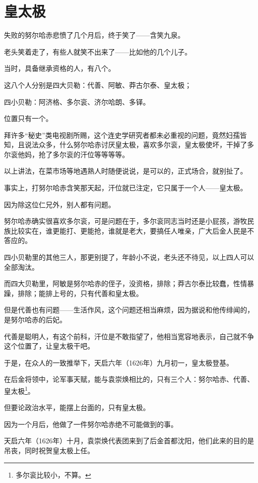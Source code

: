 \section{皇太极}
\ifnum{}
	\begin{multicols}{\theparacolNo}
\fi
失败的努尔哈赤悲愤了几个月后，终于笑了——含笑九泉。

老头笑着走了，有些人就笑不出来了——比如他的几个儿子。

当时，具备继承资格的人，有八个。

这八个人分别是四大贝勒：代善、阿敏、莽古尔泰、皇太极；

四小贝勒：阿济格、多尔衮、济尔哈朗、多铎。

位置只有一个。

拜许多“秘史”类电视剧所赐，这个连史学研究者都未必重视的问题，竟然妇孺皆知，且说法众多，什么努尔哈赤讨厌皇太极，喜欢多尔衮，皇太极使坏，干掉了多尔衮他妈，抢了多尔衮的汗位等等等等。

以上讲法，在菜市场等地遇熟人时随便说说，是可以的，正式场合，就别扯了。

事实上，打努尔哈赤含笑那天起，汗位就已注定，它只属于一个人——皇太极。

因为除这位仁兄外，别人都有问题。

努尔哈赤确实很喜欢多尔衮，可是问题在于，多尔衮同志当时还是小屁孩，游牧民族比较实在，谁更能打、更能抢，谁就是老大，要搞任人唯亲，广大后金人民是不答应的。

四小贝勒里的其他三人，那更别提了，年龄小不说，老头还不待见，以上四人可以全部淘汰。

而四大贝勒里，阿敏是努尔哈赤的侄子，没资格，排除；莽古尔泰比较蠢，性情暴躁，排除；能排上号的，只有代善和皇太极。

但是代善也有问题——生活作风，这个问题还相当麻烦，因为据说和他传绯闻的，是努尔哈赤的后妃。

代善是聪明人，有这个前科，汗位是不敢指望了，他相当宽容地表示，自己就不争这个位置了，让皇太极干吧。

于是，在众人的一致推举下，天启六年（1626年）九月初一，皇太极登基。

在后金将领中，论军事天赋，能与袁崇焕相比的，只有三个人：努尔哈赤、代善、皇太极\footnote{多尔衮比较小，不算。}。

但要论政治水平，能摆上台面的，只有皇太极。

因为一个月后，他做了一件努尔哈赤绝不可能做到的事。

天启六年（1626年）十月，袁崇焕代表团来到了后金首都沈阳，他们此来的目的是吊丧，同时祝贺皇太极上任。


\end{multicols}
